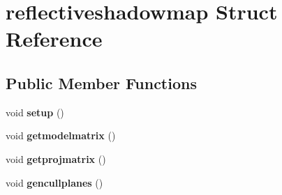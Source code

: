 \hypertarget{structreflectiveshadowmap}{}\section{reflectiveshadowmap Struct Reference}
\label{structreflectiveshadowmap}
\subsection*{Public Member Functions}
\begin{DoxyCompactItemize}
\item 
\mbox{\label{structreflectiveshadowmap_a93b61e873fca916fcd560d20fe7a4a78}} 
void {\bfseries setup} ()
\item 
\mbox{\label{structreflectiveshadowmap_a96966a158343d0d567e6da06721faddf}} 
void {\bfseries getmodelmatrix} ()
\item 
\mbox{\label{structreflectiveshadowmap_ae52743169e808da422340fb15b80241c}} 
void {\bfseries getprojmatrix} ()
\item 
\mbox{\label{structreflectiveshadowmap_a81d72156dddd672fa4cba3b34d07a44e}} 
void {\bfseries gencullplanes} ()
\end{DoxyCompactItemize}
